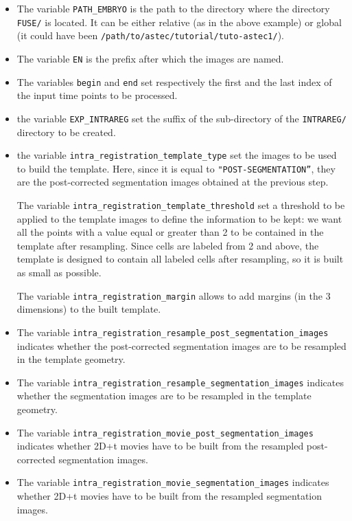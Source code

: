 \begin{itemize}
  \itemsep -0.5ex
  \item The variable \texttt{PATH\_EMBRYO} is the path to the directory where
    the directory \texttt{FUSE/} is located. It can be either relative (as in the
    above example) or
    global (it could have been \texttt{/path/to/astec/tutorial/tuto-astec1/}).
  \item The variable \texttt{EN} is the prefix after which the  images
    are named. 
  \item The variables \texttt{begin} and \texttt{end} set respectively the
    first and the last index of the input time points to be processed.
  \item  the variable \texttt{EXP\_INTRAREG} set the suffix of the
    sub-directory of the \texttt{INTRAREG/} directory to be created.
  \item  the variable \texttt{intra\_registration\_template\_type} set
    the images to be used to build the template. Here, since it is
    equal to \texttt{"POST-SEGMENTATION''}, they are the
    post-corrected segmentation images obtained at the previous step.

    The variable \texttt{intra\_registration\_template\_threshold} set
    a threshold to be applied to the template images to define the
    information to be kept: we want all the points with a value equal
    or greater than 2 to be contained in the template after
    resampling. Since cells are labeled from 2 and above, the template
    is designed to contain all labeled cells after resampling, so it
    is built as small as possible.

    The variable \texttt{intra\_registration\_margin} allows to add
    margins (in the 3 dimensions) to the built template.
    
  \item The variable
    \texttt{intra\_registration\_resample\_post\_segmentation\_images}
    indicates whether the post-corrected segmentation images are to be resampled in
    the template geometry. 
  \item The variable
    \texttt{intra\_registration\_resample\_segmentation\_images}
    indicates whether the segmentation images are to be resampled in
    the template geometry. 
  \item The variable
    \texttt{intra\_registration\_movie\_post\_segmentation\_images}
    indicates whether 2D+t movies have to be built from the resampled
    post-corrected segmentation images.
  \item The variable
    \texttt{intra\_registration\_movie\_segmentation\_images}
    indicates whether 2D+t movies have to be built from the resampled
    segmentation images.
\end{itemize}

